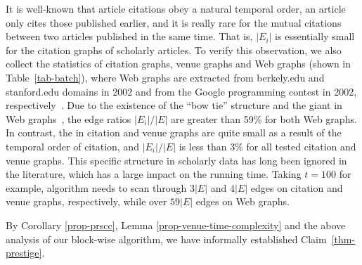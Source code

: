 It is well-known that article citations obey a natural temporal order, \ie an article only cites those published earlier, and it is really rare for the mutual citations between two articles published in the same time. That is, $|E_i|$ is essentially small for the citation graphs of scholarly articles.
%
To verify this observation, we also collect the statistics of citation graphs, venue graphs and Web graphs (shown in Table~\ref{tab-batch}), where Web graphs are extracted from berkely.edu and stanford.edu domains in 2002 and from the Google programming contest in 2002, respectively~\cite{LeskovecLDM09}.
Due to the existence of the ``bow tie'' structure and the giant \scc in Web graphs~\cite{BroderKMRRSTW00}, the edge ratios $|E_i|/|E|$ are greater than 59\% for both Web graphs. In contrast, the \sccs in citation and venue graphs are quite small as a result of the temporal order of citation, and $|E_i|/|E|$ is less than 3\% for all tested citation and venue graphs.
%
This specific structure in scholarly data has long been ignored in the literature, which has a large impact on the running time. Taking $t=100$ for example, algorithm \twprscc needs to scan through $3|E|$ and $4|E|$ edges on citation and venue graphs, respectively, while over $59|E|$ edges on Web graphs.


By Corollary \ref{prop-prscc}, Lemma \ref{prop-venue-time-complexity} and the  above analysis of our block-wise algorithm, we have informally established Claim~\ref{thm-prestige}.





